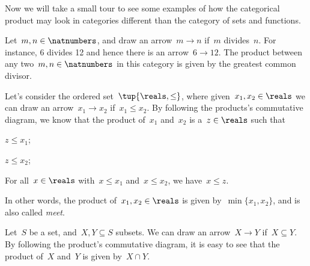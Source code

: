 Now we will take a small tour to see some examples of how the categorical product may look in categories different than the category \Set of sets and functions.

\begin{example}
    Let~$m,n\in \natnumbers$, and draw an arrow~$m\to n$ if~$m$ divides~$n$. For instance, 6 divides 12 and hence there is an arrow~$6\to 12$. The product between any two~$m,n\in \natnumbers$ in this category is given by the greatest common divisor.
\end{example}

\begin{example}
    Let's consider the ordered set~$\tup{\reals,\leq}$, where given~$x_1,x_2\in \reals$ we can draw an arrow~$x_1\to x_2$ if~$x_1\leq x_2$. By following the products's commutative diagram, we know that the product of~$x_1$ and~$x_2$ is a~$z\in \reals$ such that
    \begin{compactitem}
        \item $z\leq x_1$;
        \item $z\leq x_2$;
        \item For all~$x\in \reals$ with~$x\leq x_1$ and~$x\leq x_2$, we have~$x\leq z$.
    \end{compactitem}
    In other words, the product of~$x_1,x_2\in \reals$ is given by~$\min\{x_1,x_2\}$, and is also called \emph{meet}.
\end{example}

\begin{example}
    \label{ex:subset_prod}
    Let~$S$ be a set, and~$X,Y\subseteq S$ subsets. We can draw an arrow~$X\to Y$ if~$X\subseteq Y$. By following the product's commutative diagram, it is easy to see that the product of~$X$ and~$Y$ is given by~$X\cap Y$.
\end{example}


